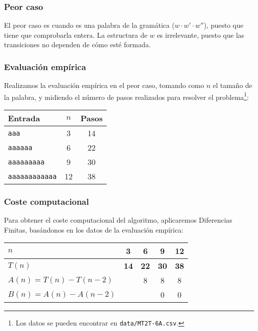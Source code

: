 

\subsubsection*{Peor caso}
El peor caso es cuando es una palabra de la gramática ($w \cdot w' \cdot w''$), puesto que tiene que comprobarla entera. La estructura de $w$ es irrelevante, puesto que las transiciones no dependen de cómo esté formada.


\subsubsection*{Evaluación empírica}
Realizamos la evaluación empírica en el peor caso, tomando como $n$ el tamaño de la palabra, y midiendo el número de pasos realizados para resolver el problema\footnote{Los datos se pueden encontrar en \texttt{data/MT2T-6A.csv}.}:

\begin{table}[h]
    \centering
    \begin{tabular}{lcc}
        Entrada & $n$ & Pasos \\
        \hline
        \texttt{aaa}                &  3  & 14 \\
        \texttt{aaaaaa}             &  6  & 22 \\
        \texttt{aaaaaaaaa}          &  9  & 30 \\
        \texttt{aaaaaaaaaaaa}       & 12  & 38 \\
    \end{tabular}
\end{table}


\subsubsection*{Coste computacional}
Para obtener el coste computacional del algoritmo, aplicaremos Diferencias Finitas, basándonos en los datos de la evaluación empírica:

\begin{table}[H]
    \centering
    \begin{tabular}{|l|c|c|c|c|}
        \hline
        $n$    & \textbf{3}  & \textbf{6}  & \textbf{9}  & \textbf{12} \\ \hline
        $T(n)$ & \textbf{14} & \textbf{22} & \textbf{30} & \textbf{38} \\ \hline
        \hline
        $A(n) = T(n) - T(n-2)$ &   & 8 & 8 & 8 \\ \hline
        $B(n) = A(n) - A(n-2)$ &   &   & 0 & 0 \\ \hline
    \end{tabular}
\end{table}

